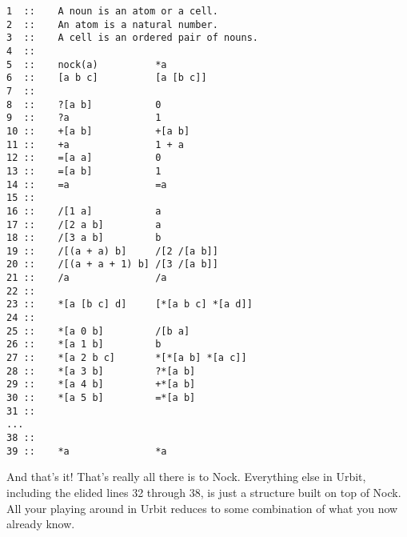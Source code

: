 \begin{framed_shaded}
\begin{Verbatim}[fontsize=\relsize{-2.5},fontseries=b,commandchars=\\\{\}]
1  ::    A noun is an atom or a cell.
2  ::    An atom is a natural number.
3  ::    A cell is an ordered pair of nouns.
4  ::
5  ::    nock(a)          *a
6  ::    [a b c]          [a [b c]]
7  ::
8  ::    ?[a b]           0
9  ::    ?a               1
10 ::    +[a b]           +[a b]
11 ::    +a               1 + a
12 ::    =[a a]           0
13 ::    =[a b]           1
14 ::    =a               =a
15 ::
16 ::    /[1 a]           a
17 ::    /[2 a b]         a
18 ::    /[3 a b]         b
19 ::    /[(a + a) b]     /[2 /[a b]]
20 ::    /[(a + a + 1) b] /[3 /[a b]]
21 ::    /a               /a
22 ::
23 ::    *[a [b c] d]     [*[a b c] *[a d]]
24 ::
25 ::    *[a 0 b]         /[b a]
26 ::    *[a 1 b]         b
27 ::    *[a 2 b c]       *[*[a b] *[a c]]
28 ::    *[a 3 b]         ?*[a b]
29 ::    *[a 4 b]         +*[a b]
30 ::    *[a 5 b]         =*[a b]
31 ::
...
38 ::
39 ::    *a               *a
\end{Verbatim}
\end{framed_shaded}

And that's it! That's really all there is to Nock. Everything else in Urbit, including the elided lines 32 through 38, is just a structure built on top of Nock. All your playing around in Urbit reduces to some combination of what you now already know. 